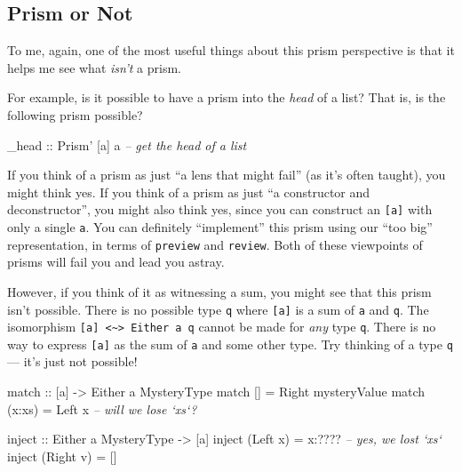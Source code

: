 \documentclass[]{article}
\newenvironment{Shaded}{}{}
\newcommand{\CommentTok}[1]{\textcolor[rgb]{0.38,0.63,0.69}{\textit{#1}}}
\newcommand{\DataTypeTok}[1]{\textcolor[rgb]{0.56,0.13,0.00}{#1}}
\newcommand{\FunctionTok}[1]{\textcolor[rgb]{0.02,0.16,0.49}{#1}}
\newcommand{\NormalTok}[1]{#1}
\newcommand{\OtherTok}[1]{\textcolor[rgb]{0.00,0.44,0.13}{#1}}
\begin{document}
\hypertarget{prism-or-not}{%
\subsection{Prism or Not}\label{prism-or-not}}

To me, again, one of the most useful things about this prism perspective is that
it helps me see what \emph{isn't} a prism.

For example, is it possible to have a prism into the \emph{head} of a list? That
is, is the following prism possible?

\begin{Shaded}
\begin{Highlighting}[]
\OtherTok{_head ::} \DataTypeTok{Prism'}\NormalTok{ [a] a           }\CommentTok{-- get the head of a list}
\end{Highlighting}
\end{Shaded}

If you think of a prism as just ``a lens that might fail'' (as it's often
taught), you might think yes. If you think of a prism as just ``a constructor
and deconstructor'', you might also think yes, since you can construct an
\texttt{{[}a{]}} with only a single \texttt{a}. You can definitely ``implement''
this prism using our ``too big'' representation, in terms of \texttt{preview}
and \texttt{review}. Both of these viewpoints of prisms will fail you and lead
you astray.

However, if you think of it as witnessing a sum, you might see that this prism
isn't possible. There is no possible type \texttt{q} where \texttt{{[}a{]}} is a
sum of \texttt{a} and \texttt{q}. The isomorphism
\texttt{{[}a{]}\ \textless{}\textasciitilde{}\textgreater{}\ Either\ a\ q}
cannot be made for \emph{any} type \texttt{q}. There is no way to express
\texttt{{[}a{]}} as the sum of \texttt{a} and some other type. Try thinking of a
type \texttt{q} --- it's just not possible!

\begin{Shaded}
\begin{Highlighting}[]
\OtherTok{match ::}\NormalTok{ [a] }\OtherTok{->} \DataTypeTok{Either}\NormalTok{ a }\DataTypeTok{MysteryType}
\NormalTok{match []     }\FunctionTok{=} \DataTypeTok{Right}\NormalTok{ mysteryValue}
\NormalTok{match (x}\FunctionTok{:}\NormalTok{xs) }\FunctionTok{=} \DataTypeTok{Left}\NormalTok{ x                       }\CommentTok{-- will we lose `xs`?}

\OtherTok{inject ::} \DataTypeTok{Either}\NormalTok{ a }\DataTypeTok{MysteryType} \OtherTok{->}\NormalTok{ [a]}
\NormalTok{inject (}\DataTypeTok{Left}\NormalTok{ x)  }\FunctionTok{=}\NormalTok{ x}\FunctionTok{:????}                   \CommentTok{-- yes, we lost `xs`}
\NormalTok{inject (}\DataTypeTok{Right}\NormalTok{ v) }\FunctionTok{=}\NormalTok{ []}
\end{Highlighting}
\end{Shaded}
\end{document}
